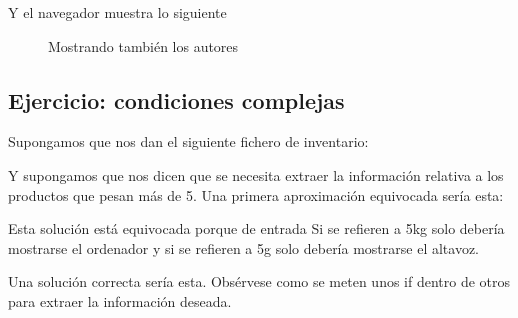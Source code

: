 \documentclass[letterpaper,10pt,spanish]{sphinxmanual}
\begin{document}
Y el navegador muestra lo siguiente

\begin{figure}[htbp]
\centering
\capstart

\noindent{}
\caption{Mostrando también los autores}\label{\detokenize{tema7:id9}}\end{figure}


\subsection{Ejercicio: condiciones complejas}
\label{\detokenize{tema7:ejercicio-condiciones-complejas}}
Supongamos que nos dan el siguiente fichero de inventario:

Y supongamos que nos dicen que se necesita extraer la información relativa a los productos que pesan más de 5. Una primera aproximación equivocada sería esta:

\begin{sphinxVerbatim}[commandchars=\\\{\}]
 
     
       
           
\end{sphinxVerbatim}

Esta solución está equivocada porque de entrada  Si se refieren a 5kg solo debería mostrarse el ordenador y si se refieren a 5g solo debería mostrarse el altavoz.

Una solución correcta sería esta. Obsérvese como se meten unos if dentro de otros para extraer la información deseada.
\end{document}
